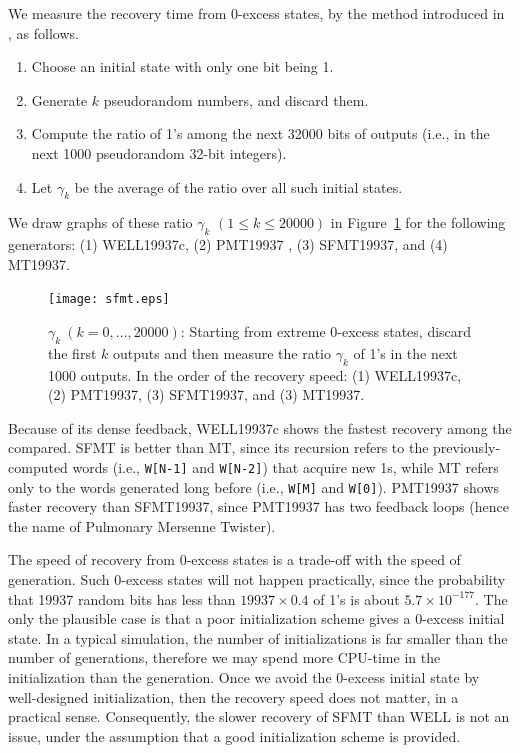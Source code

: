 \documentclass[acmnow]{acmtrans2m}
\begin{document}
We measure the recovery time from 0-excess states, 
by the method introduced in \cite{WELL}, as follows.
\begin{enumerate}
\item Choose an initial state with only one bit being 1.
\item Generate $k$ pseudorandom numbers, and discard them.
\item Compute the ratio of 1's among the 
next 32000 bits of outputs
(i.e., in the next 1000 pseudorandom 32-bit integers).
\item Let $\gamma_k$ be the average of the ratio over
all such initial states.
\end{enumerate}
We draw graphs of these ratio $\gamma_k$ $(1 \leq k \leq 20000)$
in Figure~\ref{fig:zero-recovery}
for the following generators: (1) WELL19937c, 
(2) PMT19937 \cite{PMT}, (3) SFMT19937, and (4) MT19937. 
\begin{figure}
\texttt{[image: sfmt.eps]}
\caption{$\gamma_k \ (k=0,\ldots,20000)$:
Starting from extreme 0-excess states,
discard the first $k$ outputs and then measure
the ratio $\gamma_k$ of 1's in the next 1000 outputs. 
In the order of the recovery speed: 
(1) WELL19937c, 
(2) PMT19937, (3) SFMT19937, and (3) MT19937.
}\label{fig:zero-recovery}
\end{figure}
Because of its dense feedback, WELL19937c shows
the fastest recovery among the compared. 
SFMT is better than MT, since its recursion refers to 
the previously-computed words (i.e., {\tt W[N-1]} and {\tt W[N-2]}) 
that acquire new 1s, while
MT refers only to the words generated long before 
(i.e., {\tt W[M]} and {\tt W[0]}). PMT19937 shows faster recovery 
than SFMT19937, since PMT19937 has two feedback loops
(hence the name of Pulmonary Mersenne Twister).

The speed of recovery from 0-excess states 
is a trade-off 
with the speed of generation. 
Such 0-excess states will not happen practically, 
since the probability 
that 19937 random bits has less than $19937\times 0.4$ of 1's 
is about $5.7\times 10^{-177}$.
The only the plausible case is that
a poor initialization scheme gives a 0-excess initial state. 
In a typical simulation, the number of 
initializations is far smaller than the number of generations,
therefore we may spend more CPU-time in the initialization
than the generation. Once we avoid the 0-excess initial state
by well-designed initialization, then the recovery 
speed does not matter, in a practical sense. 
Consequently, the slower recovery of SFMT than WELL 
is not an issue, under the assumption that
a good initialization scheme is provided. 
\end{document}

